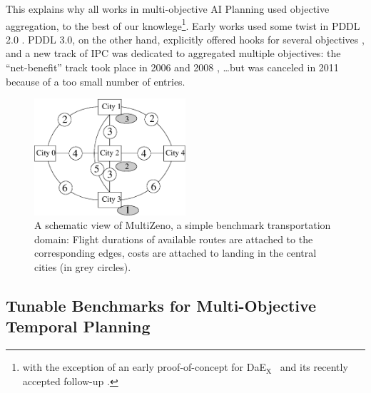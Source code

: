 \documentclass{llncs}
\def\DAEX{{\sc DaE$_{\text{X}}$}}
\def\MULTIZENO{{\sc MultiZeno}}
\begin{document}
This explains why all works in multi-objective AI Planning used objective aggregation, to the best of our knowlege\footnote{with the exception of an early proof-of-concept for \DAEX\ \cite{Schoenauer2006} and its recently accepted follow-up \cite{emo2013}.}. Early works used some twist in PDDL 2.0 \cite{do2003sapa,refanidis2003multiobjective,gerevini2008}. PDDL 3.0, on the other hand, explicitly offered hooks for several objectives \cite{gerevini2006preferences}, and a new track of IPC was dedicated to aggregated multiple objectives: the ``net-benefit'' track took place in 2006 \cite{chen2006temporal} and 2008 \cite{edelkamp2009optimal}, \ldots but was canceled in 2011 because of a too small number of entries.


\begin{figure}[tb]
\begin{center}
 \includegraphics[width=0.5\textwidth]{./miniMulti.eps}
\caption{A schematic view of \MULTIZENO, a simple benchmark transportation domain: Flight durations of available routes are attached to the corresponding edges, costs are attached to landing in the central cities (in grey circles).}
\label{fig.instance}
\end{center}
\vskip -0.4cm
\end{figure}

\subsection{Tunable Benchmarks for Multi-Objective Temporal Planning}
\label{sec:benchmark}
\end{document}
